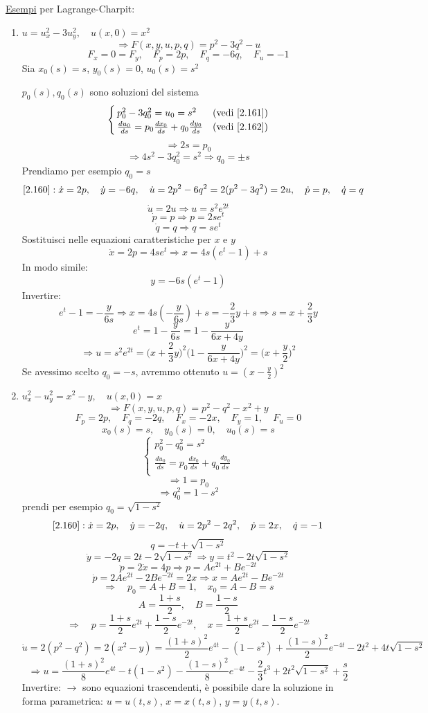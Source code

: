 \documentclass[a4paper,11pt]{report}
\begin{document}
\underline{Esempi} per Lagrange-Charpit:
\begin{enumerate}[label=(\roman*)]
\item $u=u_x^2 - 3u_y^2, \quad u(x,0)=x^2$
\[
\Rightarrow F(x,y,u,p,q)=p^2-3q^2-u
\]
\[
F_x=0=F_y, \quad F_p=2p, \quad F_q=-6q, \quad F_u = -1
\]
Sia $x_0(s)=s$, $y_0(s)=0$, $u_0(s)=s^2$

$p_0(s),q_0(s)$ sono soluzioni del sistema
\[
\begin{cases}
p_0^2 - 3q_0^2=u_0=s^2 & \text{(vedi \eqref{2.161})} \\
\frac{du_0}{ds}=p_0 \frac{dx_0}{ds}+q_0\frac{dy_0}{ds} & \text{(vedi \eqref{2.162})}
\end{cases}
\]
\[
\Rightarrow 2s=p_0
\]
\[
\Rightarrow 4s^2 - 3q_0^2 = s^2 \Rightarrow q_0=\pm s
\]
Prendiamo per esempio $q_0=s$
\[
\eqref{2.160}: \dot{x}=2p,\quad \dot{y}=-6q,\quad \dot{u}=2p^2 - 6q^2 = 2(p^2-3q^2)=2u,\quad \dot{p}=p,\quad \dot{q}=q
\]
\[
\dot{u}=2u \Rightarrow u=s^2e^{2t}
\]
\[
\dot{p}=p \Rightarrow p=2se^t
\]
\[
\dot{q}=q \Rightarrow q=se^t
\]
Sostituisci nelle equazioni caratteristiche per $x$ e $y$
\[
\dot{x}=2p=4se^t \Rightarrow x= 4s(e^t -1) +s
\]
In modo simile:
\[
y=-6s(e^t -1)
\]
Invertire:
\[
e^t-1=-\frac{y}{6s} \Rightarrow x=4s\left(-\frac{y}{6s}\right) + s=-\frac{2}{3}y + s \Rightarrow s=x+\frac{2}{3}y
\]
\[
e^t=1-\frac{y}{6s}=1-\frac{y}{6x+4y} 
\]
\[
\Rightarrow u=s^2 e^{2t}= \Big(x+\frac{2}{3}y\Big)^2\Big(1-\frac{y}{6x+4y}\Big)^2=\Big(x+\frac{y}{2}\Big)^2
\]
Se avessimo scelto $q_0=-s$, avremmo ottenuto $u=\left(x-\frac{y}{2}\right)^2$

\item $u_x^2 - u_y^2 = x^2 - y, \quad u(x,0)=x$
\[
\Rightarrow F(x,y,u,p,q) = p^2 - q^2 - x^2 + y
\]
\[
F_p=2p,\quad F_q=-2q,\quad F_x = -2x,\quad F_y=1,\quad F_u=0
\]
\[
x_0(s)=s,\quad y_0(s)=0,\quad u_0(s)=s 
\]
\[
\begin{cases}
p_0^2 - q_0^2 = s^2 \\
\frac{du_0}{ds}=p_0\frac{dx_0}{ds}+q_0\frac{dy_0}{ds} \\
\end{cases}
\]
\[
\Rightarrow 1=p_0
\]
\[
\Rightarrow q_0^2=1-s^2
\]
prendi per esempio $q_0=\sqrt{1-s^2}$
\[
\eqref{2.160}: \dot{x}=2p,\quad \dot{y}=-2q,\quad \dot{u}=2p^2 - 2q^2,\quad \dot{p}=2x,\quad \dot{q}=-1
\]
\[
q=-t+\sqrt{1-s^2}
\]
\[
\dot{y}=-2q=2t-2\sqrt{1-s^2} \Rightarrow y= t^2-2t\sqrt{1-s^2}
\]
\[
\ddot{p}=2\dot{x}=4p \Rightarrow p=Ae^{2t} + Be^{-2t}
\]
\[
\dot{p}=2Ae^{2t}-2Be^{-2t}=2x \Rightarrow x=Ae^{2t}-Be^{-2t}
\]
\[
\Rightarrow \quad p_0=A+B=1, \quad x_0=A-B=s 
\]
\[
A=\frac{1+s}{2}, \quad B=\frac{1-s}{2}
\]
\[
\Rightarrow \quad p=\frac{1+s}{2}e^{2t}+\frac{1-s}{2}e^{-2t}, \quad x=\frac{1+s}{2}e^{2t}-\frac{1-s}{2}e^{-2t}
\]
\[
\dot{u}=2(p^2-q^2)=2(x^2-y) = \frac{(1+s)^2}{2}e^{4t} - (1-s^2)+\frac{(1-s)^2}{2}e^{-4t}-2t^2 + 4t\sqrt{1-s^2}
\]
\[
\Rightarrow u=\frac{(1+s)^2}{8}e^{4t} - t(1-s^2) - \frac{(1-s)^2}{8}e^{-4t}-\frac{2}{3}t^3 + 2t^2\sqrt{1-s^2}+\frac{s}{2}
\]
Invertire: $\rightarrow$ sono equazioni trascendenti, \`e possibile dare la soluzione in forma parametrica: $u=u(t,s)$, $x=x(t,s)$, $y=y(t,s)$.


\end{enumerate}
\end{document}
